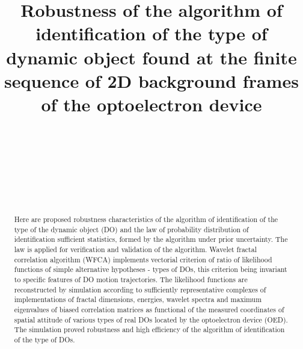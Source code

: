 \documentclass[
11pt,%
tightenlines,%
twoside,%
onecolumn,%
nofloats,%
nobibnotes,%
nofootinbib,%
superscriptaddress,%
noshowpacs,%
centertags]%
{revtex4}
\begin{document}

\title{Robustness of the algorithm of identification of the type of dynamic object found at the finite sequence of 2D background frames of the optoelectron device}


\author{~}

\author{~}

\author{~}

\author{~}




\begin{abstract}
Here are proposed robustness characteristics of the algorithm of identification of the type of the dynamic object (DO) and the law of probability distribution of identification sufficient statistics, formed by the algorithm under prior uncertainty.
The law is applied for verification and validation of the algorithm.
Wavelet fractal correlation algorithm (WFCA) implements vectorial criterion of ratio of likelihood functions of simple alternative hypotheses - types of DOs, this criterion being invariant to specific features of DO motion trajectories.
The likelihood functions are reconstructed by simulation according to sufficiently representative complexes of implementations of fractal dimensions, energies, wavelet spectra and maximum eigenvalues of biased correlation matrices as functional of the measured coordinates of spatial attitude of various types of real DOs located by the optoelectron device (OED).
The simulation proved  robustness and high efficiency of the algorithm of identification of the type of DOs.
\end{abstract}
\end{document}
